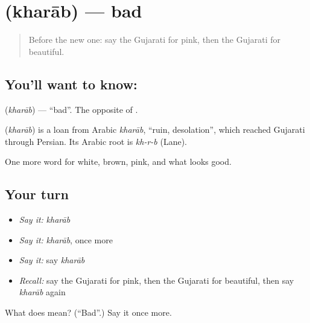 \section[\texorpdfstring{\gu{ખરાબ} (kharāb)}{ખરાબ (kharāb)}]{ (kharāb) — bad}

\label{lesson:GU-C71-bad}



\begin{quote}
Before the new one: say the Gujarati for pink, then the Gujarati for beautiful.
\end{quote}

\subsection*{You'll want to know: }
\textbf{} (\emph{kharāb}) — \textquotedblleft{}bad\textquotedblright{}. The opposite of \textbf{}.

\begin{cousinweb}
\textbf{} (\emph{kharāb}) is a loan from Arabic \emph{kharāb}, \textquotedblleft{}ruin, desolation\textquotedblright{}, which reached Gujarati through Persian. Its Arabic root is \emph{kh-r-b} (Lane).
\end{cousinweb}

\begin{grammarlens}[title={What you've built}]
One more word for white, brown, pink, and what looks good.
\end{grammarlens}

\subsection*{Your turn}
\begin{itemize}
\raggedright
  \item \emph{Say it:} \emph{kharāb}
  \item \emph{Say it:} \emph{kharāb}, once more
  \item \emph{Say it:} say \emph{kharāb}
  \item \emph{Recall:} say the Gujarati for pink, then the Gujarati for beautiful, then say \emph{kharāb} again
\end{itemize}

\begin{tcolorbox}[breakable,colback=teal!4,colframe=teal!35!black,title={Before you move on}]
What does  mean? (\textquotedblleft{}Bad\textquotedblright{}.) Say it once more.
\end{tcolorbox}
